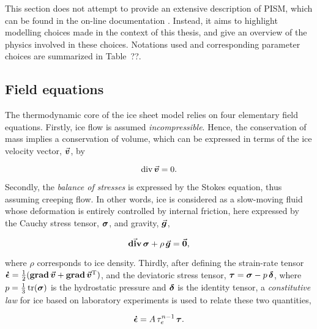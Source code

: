 \documentclass{article}
\newcommand{\vect}[1]{\va*{#1}} %
\newcommand{\tens}[1]{\vb*{#1}} %
\renewcommand{\div}[1]{\mathrm{div}\,#1}            %
\newcommand{\tdiv}[1]{\vect{\mathrm{div}}\,#1}      %
\newcommand{\tgrad}[1]{\tens{\mathrm{grad}}\,#1}    %
\newcommand{\doteps}[0]{\dot{\epsilon}} %
\newcommand{\IDT}[0]{\tens{\delta}}     %
\newcommand{\CST}[0]{\tens{\sigma}}     %
\newcommand{\DST}[0]{\tens{\tau}}       %
\newcommand{\SRT}[0]{\tens{\doteps}}    %
\newcommand{\vv}[0]{\vect{v}}           %
\begin{document}

This section does not attempt to provide an extensive description of PISM,
which can be found in the on-line documentation \citep{PISM-authors.2014}.
Instead, it aims to highlight modelling choices made in the context of this
thesis, and give an overview of the physics involved in these choices.
Notations used and corresponding parameter choices are summarized in Table~??.

\subsection{Field equations}

The thermodynamic core of the ice sheet model relies on four elementary field
equations. Firstly, ice flow is assumed \emph{incompressible}. Hence, the
conservation of mass implies a conservation of volume, which can be expressed
in terms of the ice velocity vector, $\vv$, by

\begin{equation}
    \label{eqn:incompressibility}
    \div{\vv} = 0.
\end{equation}

Secondly, the \emph{balance of stresses} is expressed by the Stokes equation,
thus assuming creeping flow. In other words, ice is considered as a slow-moving
fluid whose deformation is entirely controlled by internal friction, here
expressed by the Cauchy stress tensor, $\CST$, and gravity, $\vect{g}$,

\begin{equation}
    \label{eqn:stressbalance}
    \tdiv{\CST} + \rho\,\vect{g} = \vect{0},
\end{equation}

where $\rho$ corresponds to ice density. Thirdly, after defining the
strain-rate tensor
${\SRT = \frac{1}{2}(\tgrad{\vv} + \tgrad{\vv}^{\mathrm{T}})}$,
and the deviatoric stress tensor, ${\DST = \CST - p\,\IDT}$,
where $p=\frac{1}{3}\tr(\CST)$ is the hydrostatic pressure and
$\tens{\delta}$ is the identity tensor, a \emph{constitutive law} for ice based
on laboratory experiments is used to relate these two quantities,

\begin{equation}
    \label{eqn:glenslaw}
    \SRT = A\,\tau_e^{n-1}\,\DST.
\end{equation}
\end{document}
